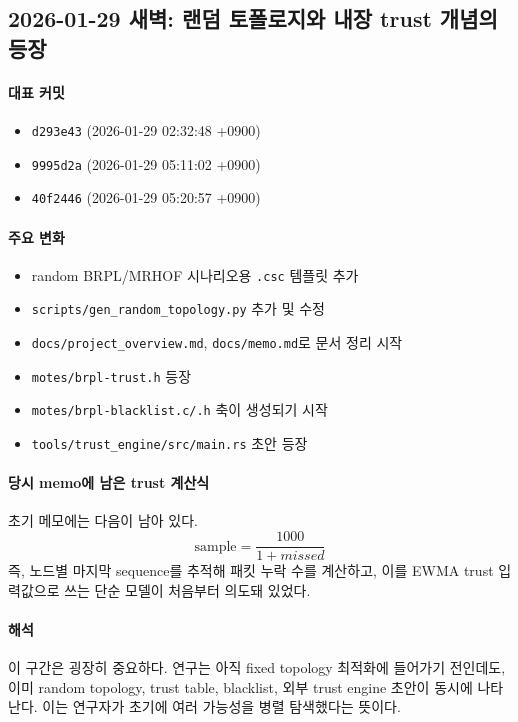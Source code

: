 \documentclass[12pt,a4paper]{article}
\begin{document}
\subsection{2026-01-29 새벽: 랜덤 토폴로지와 내장 trust 개념의 등장}

\paragraph{대표 커밋}
\begin{itemize}[leftmargin=1.5em]
\item \texttt{d293e43} (2026-01-29 02:32:48 +0900)
\item \texttt{9995d2a} (2026-01-29 05:11:02 +0900)
\item \texttt{40f2446} (2026-01-29 05:20:57 +0900)
\end{itemize}

\paragraph{주요 변화}
\begin{itemize}[leftmargin=1.5em]
\item random BRPL/MRHOF 시나리오용 \texttt{.csc} 템플릿 추가
\item \texttt{scripts/gen\_random\_topology.py} 추가 및 수정
\item \texttt{docs/project\_overview.md}, \texttt{docs/memo.md}로 문서 정리 시작
\item \texttt{motes/brpl-trust.h} 등장
\item \texttt{motes/brpl-blacklist.c/.h} 축이 생성되기 시작
\item \texttt{tools/trust\_engine/src/main.rs} 초안 등장
\end{itemize}

\paragraph{당시 memo에 남은 trust 계산식}
초기 메모에는 다음이 남아 있다.
\[
\text{sample} = \frac{1000}{1 + missed}
\]
즉, 노드별 마지막 sequence를 추적해 패킷 누락 수를 계산하고,
이를 EWMA trust 입력값으로 쓰는 단순 모델이 처음부터 의도돼 있었다.

\paragraph{해석}
이 구간은 굉장히 중요하다. 연구는 아직 fixed topology 최적화에 들어가기 전인데도,
이미 random topology, trust table, blacklist, 외부 trust engine 초안이 동시에
나타난다. 이는 연구자가 초기에 여러 가능성을 병렬 탐색했다는 뜻이다.
\end{document}
